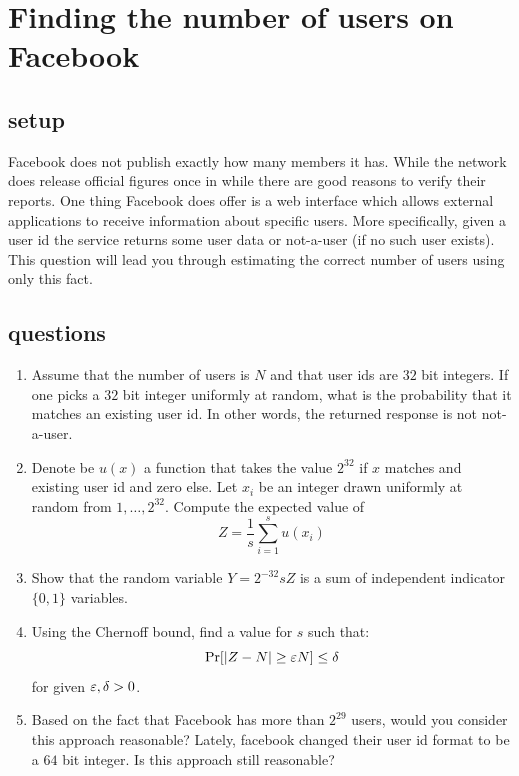 \documentclass{article}
\begin{document}

\section{Finding the number of users on Facebook}
\subsection*{setup}
Facebook does not publish exactly how many members it has. 
While the network does release official figures once in while there are good reasons to verify their reports.
One thing Facebook does offer is a web interface which allows external applications to receive information about specific users.
More specifically, given a user id the service returns some user data or not-a-user (if no such user exists).
This question will lead you through estimating the correct number of users using only this fact.
\subsection*{questions}
\begin{enumerate}
\item Assume that the number of users is $N$ and that user ids are $32$ bit integers.
If one picks a $32$ bit integer uniformly at random, what is the probability that it matches an existing user id. In other words, the returned response is not not-a-user.
\item Denote be $u(x)$ a function that takes the value $2^{32}$ if $x$ matches and existing user id and zero else.
Let $x_i$ be an integer drawn uniformly at random from $1,\ldots,2^{32}$. Compute the expected value of $$Z = \frac{1}{s}\sum_{i=1}^{s} u(x_i)$$
\item Show that the random variable $Y = 2^{-32}sZ$ is a sum of independent indicator $\{0,1\}$ variables.
\item Using the Chernoff bound, find a value for $s$ such that: $$\Pr[|Z-N| \ge \varepsilon N] \le \delta$$ for given $\varepsilon,\delta >0$.
\item Based on the fact that Facebook has more than $2^{29}$ users, would you consider this approach reasonable?
Lately, facebook changed their user id format to be a $64$ bit integer. Is this approach still reasonable?
\end{enumerate}

\pagebreak
\end{document}
